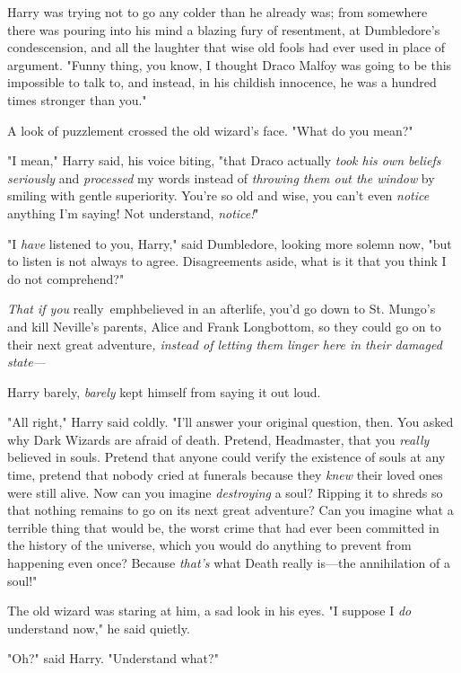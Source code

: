 Harry was trying not to go any colder than he already was; from somewhere there 
was pouring into his mind a blazing fury of resentment, at Dumbledore's 
condescension, and all the laughter that wise old fools had ever used in place 
of argument. "Funny thing, you know, I thought Draco Malfoy was going to be 
this impossible to talk to, and instead, in his childish innocence, he was a 
hundred times stronger than you."

A look of puzzlement crossed the old wizard's face. "What do you mean?"

"I mean," Harry said, his voice biting, "that Draco actually \emph{took his own 
beliefs seriously} and \emph{processed} my words instead of \emph{throwing them 
out the window} by smiling with gentle superiority. You're so old and wise, you 
can't even \emph{notice} anything I'm saying! Not understand, \emph{notice!}"

"I \emph{have} listened to you, Harry," said Dumbledore, looking more solemn 
now, "but to listen is not always to agree. Disagreements aside, what is it 
that you think I do not comprehend?"

\emph{That if you} really\ emph{believed in an afterlife, you'd go down to St. 
Mungo's and kill Neville's parents, Alice and Frank Longbottom, so they could 
go on to their} next great adventure\emph{, instead of letting them linger here 
in their damaged state---}

Harry barely, \emph{barely} kept himself from saying it out loud.

"All right," Harry said coldly. "I'll answer your original question, then. You 
asked why Dark Wizards are afraid of death. Pretend, Headmaster, that you 
\emph{really} believed in souls. Pretend that anyone could verify the existence 
of souls at any time, pretend that nobody cried at funerals because they 
\emph{knew} their loved ones were still alive. Now can you imagine 
\emph{destroying} a soul? Ripping it to shreds so that nothing remains to go on 
its next great adventure? Can you imagine what a terrible thing that would be, 
the worst crime that had ever been committed in the history of the universe, 
which you would do anything to prevent from happening even once? Because 
\emph{that's} what Death really is---the annihilation of a soul!"

The old wizard was staring at him, a sad look in his eyes. "I suppose I 
\emph{do} understand now," he said quietly.

"Oh?" said Harry. "Understand what?"

